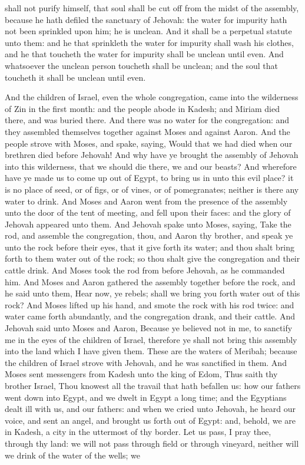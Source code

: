 shall not purify himself, that soul shall be cut off from the midst of the assembly, because he hath defiled the sanctuary of Jehovah: the water for impurity hath not been sprinkled upon him; he is unclean. And it shall be a perpetual statute unto them: and he that sprinkleth the water for impurity shall wash his clothes, and he that toucheth the water for impurity shall be unclean until even. And whatsoever the unclean person toucheth shall be unclean; and the soul that toucheth it shall be unclean until even. 

And the children of Israel, even the whole congregation, came into the wilderness of Zin in the first month: and the people abode in Kadesh; and Miriam died there, and was buried there.  And there was no water for the congregation: and they assembled themselves together against Moses and against Aaron. And the people strove with Moses, and spake, saying, Would that we had died when our brethren died before Jehovah! And why have ye brought the assembly of Jehovah into this wilderness, that we should die there, we and our beasts? And wherefore have ye made us to come up out of Egypt, to bring us in unto this evil place? it is no place of seed, or of figs, or of vines, or of pomegranates; neither is there any water to drink. And Moses and Aaron went from the presence of the assembly unto the door of the tent of meeting, and fell upon their faces: and the glory of Jehovah appeared unto them. And Jehovah spake unto Moses, saying, Take the rod, and assemble the congregation, thou, and Aaron thy brother, and speak ye unto the rock before their eyes, that it give forth its water; and thou shalt bring forth to them water out of the rock; so thou shalt give the congregation and their cattle drink. And Moses took the rod from before Jehovah, as he commanded him.  And Moses and Aaron gathered the assembly together before the rock, and he said unto them, Hear now, ye rebels; shall we bring you forth water out of this rock? And Moses lifted up his hand, and smote the rock with his rod twice: and water came forth abundantly, and the congregation drank, and their cattle. And Jehovah said unto Moses and Aaron, Because ye believed not in me, to sanctify me in the eyes of the children of Israel, therefore ye shall not bring this assembly into the land which I have given them. These are the waters of Meribah; because the children of Israel strove with Jehovah, and he was sanctified in them.  And Moses sent messengers from Kadesh unto the king of Edom, Thus saith thy brother Israel, Thou knowest all the travail that hath befallen us: how our fathers went down into Egypt, and we dwelt in Egypt a long time; and the Egyptians dealt ill with us, and our fathers: and when we cried unto Jehovah, he heard our voice, and sent an angel, and brought us forth out of Egypt: and, behold, we are in Kadesh, a city in the uttermost of thy border. Let us pass, I pray thee, through thy land: we will not pass through field or through vineyard, neither will we drink of the water of the wells; we 